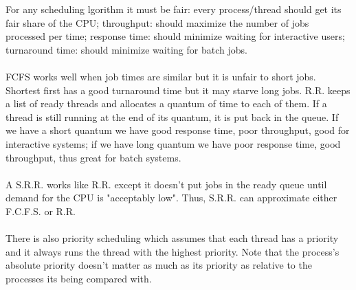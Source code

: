 \documentclass[twoside]{article}
\begin{document}
For any scheduling lgorithm it must be fair: every process/thread should get its fair share of the CPU; throughput: should maximize the number of jobs processed per time; response time: should minimize waiting for interactive users; turnaround time: should minimize waiting for batch jobs.\\ \\
FCFS works well when job times are similar but it is unfair to short jobs. Shortest first has a good turnaround time but it may starve long jobs. R.R. keeps a list of ready threads and allocates a quantum of time to each of them. If a thread is still running at the end of its quantum, it is put back in the queue. If we have a short quantum we have good response time, poor throughput, good for interactive systems; if we have long quantum we have poor response time, good throughput, thus great for batch systems.\\ \\
A S.R.R. works like R.R. except it doesn't put jobs in the ready queue until demand for the CPU is "acceptably low". Thus, S.R.R. can approximate either F.C.F.S. or R.R.\\ \\
There is also priority scheduling which assumes that each thread has a priority and it always runs the thread with the highest priority. Note that the process's absolute priority doesn't matter as much as its priority as relative to the processes its being compared with.
\end{document}
